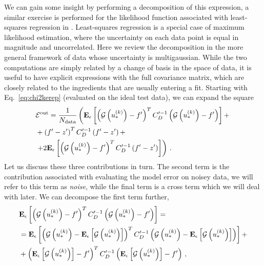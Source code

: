 We can gain some insight by performing a decomposition of this expression, a
similar exercise is performed for the likelihood function associated with
least-squares regression in \cite{mlforphysics}. Least-squares regression is a
special case of maximum likelihood estimation, where the uncertainty on each
data point is equal in magnitude and uncorrelated. Here we review the
decomposition in the more general framework of data whose uncertainty is
multigaussian. While the two computations are simply related by a change of
basis in the space of data, it is useful to have explicit expressions with the
full covariance matrix, which are closely related to the ingredients that are
usually entering a fit. Starting with Eq.~\ref{eq:chi2kerep} (evaluated on the
ideal test data), we can expand the square
\begin{equation}
    \begin{split}
    \label{eq:EoutDecomposition}
        &\eout = \frac{1}{\ndata} \left( \erep{
            \left( \model\left(u_*^{\repind}\right) - f^\prime \right)^T
            \invcovprime
            \left( \model\left(u_*^{\repind}\right) - f^\prime \right)
        } + \right. \\
        &+ %
            \left( f^\prime - \levone^\prime \right)^T
            \invcovprime
            \left( f^\prime - \levone^\prime \right)
        + \\
        &\left. + 2 \erep{
            \left( \model\left(u_*^{\repind}\right) - f^\prime \right)^T
            \invcovprime
            \left(f^\prime - \levone^\prime \right)
        }\right) \, .
    \end{split}
\end{equation}
Let us discuss these three contributions in turn. The second term is the
contribution associated with evaluating the model error on noisey data, we will
refer to this term as {\em noise}, while the final term is a cross term which we
will deal with later. We can decompose the first term further,
\begin{equation}
    \begin{split}
        &\mathbf{E}_{\epsilon}\left[ 
            \left( \mathcal{G}\left(u_*^{(k)}\right) - f^\prime \right)^T
            C_D^{\prime -1}
            \left( \mathcal{G}\left(u_*^{(k)}\right) - f^\prime \right)
         \right] = \\
        &= \mathbf{E}_{\epsilon}\left[ 
            \left( \mathcal{G}\left(u_*^{(k)}\right) - 
            \mathbf{E}_{\epsilon}\left[ \mathcal{G}\left(u_*^{(k)}\right) \right] \right)^T
            C_D^{\prime -1}
            \left( \mathcal{G}\left(u_*^{(k)}\right) - 
            \mathbf{E}_{\epsilon}\left[ \mathcal{G}\left(u_*^{(k)}\right) \right] \right)
         \right] + \\
        &+ \left( \mathbf{E}_{\epsilon}\left[ \mathcal{G}\left(u_*^{(k)}\right) \right] - f^\prime \right)^T
        C_D^{\prime -1}
        \left( \mathbf{E}_{\epsilon}\left[ \mathcal{G}\left(u_*^{(k)}\right) \right] - f^\prime \right)\, ,
    \end{split}
\end{equation}
